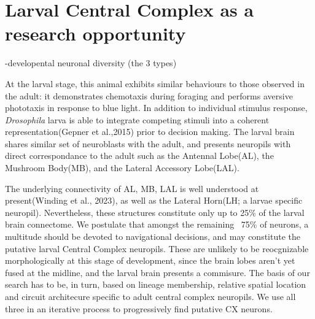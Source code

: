 \section{Larval Central Complex as a research opportunity}
    -developental neuronal diversity (the 3 types)

    At the larval stage, this animal exhibits  similar behaviours to those observed in the adult: it demonstrates chemotaxis during foraging and performs aversive phototaxis in response to blue light. In addition to individual stimulus response, \textit{Drosophila} larva is able to integrate competing stimuli into a coherent representation(Gepner et al.,2015) prior to decision making. The larval brain shares similar set of neuroblasts with the adult, and presents neuropils with direct correspondance to the adult such as the Antennal Lobe(AL), the Mushroom Body(MB), and the Lateral Accessory Lobe(LAL). 

    The underlying connectivity of AL, MB, LAL is well understood at present(Winding et al., 2023), as well as the Lateral Horn(LH; a larvae specific neuropil). Nevertheless, these structures constitute only up to 25\% of the larval brain connectome. We postulate that amongst the remaining ~75\% of neurons, a multitude should be devoted to navigational decisions, and may constitute the putative larval Central Complex neuropils. These are unlikely to be reocgnizable morphologically at this stage of development, since the brain lobes aren't yet fused at the midline, and the larval brain presents a commisure. The basis of our search has to be, in turn, based on lineage membership, relative spatial location and circuit architecure specific to adult central complex neuropils. We use all three in an iterative process to progressively find putative CX neurons.


